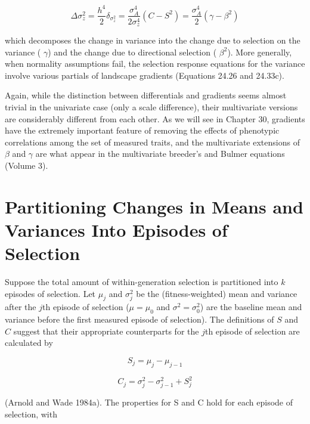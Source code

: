 \documentclass{article}
\begin{document}
\begin{equation}
\Delta\sigma_{z}^{2}=\frac{h^{4}}{2}\delta_{\sigma_{z}^{2}}=\frac{\sigma_{A}^{4}}{2\sigma_{z}^{4}}\left(C-S^{2}\right)=\frac{\sigma_{A}^{4}}{2}\left(\gamma-\beta^{2}\right)
\tag{29.21}
\label{eq:29_21}
\end{equation}

which decomposes the change in variance into the change due to selection on the variance ( $ \gamma $) and the change due to directional selection ( $ \beta^{2} $). More generally, when normality assumptions fail, the selection response equations for the variance involve various partials of landscape gradients (Equations 24.26 and 24.33c).

Again, while the distinction between differentials and gradients seems almost trivial in the univariate case (only a scale difference), their multivariate versions are considerably different from each other. As we will see in Chapter 30, gradients have the extremely important feature of removing the effects of phenotypic correlations among the set of measured traits, and the multivariate extensions of  $ \beta $ and  $ \gamma $ are what appear in the multivariate breeder's and Bulmer equations (Volume 3).

\section{Partitioning Changes in Means and Variances Into Episodes of Selection}
Suppose the total amount of within-generation selection is partitioned into $k$ episodes of selection. Let $\mu_j$ and $\sigma_j^2$ be the (fitness-weighted) mean and variance after the $j$th episode of selection ($\mu = \mu_0$ and $\sigma^2 = \sigma_0^2$) are the baseline mean and variance before the first measured episode of selection). The definitions of $S$ and $C$ suggest that their appropriate counterparts for the $j$th episode of selection are calculated by

\begin{equation}
S_{j}=\mu_{j}-\mu_{j-1}
\tag{29.22a}
\label{eq:29_22a}
\end{equation}

\begin{equation}
C_{j}=\sigma_{j}^{2}-\sigma_{j-1}^{2}+S_{j}^{2}
\tag{29.22b}
\label{eq:29_22b}
\end{equation}

(Arnold and Wade 1984a). The properties for S and C hold for each episode of selection, with
\end{document}
